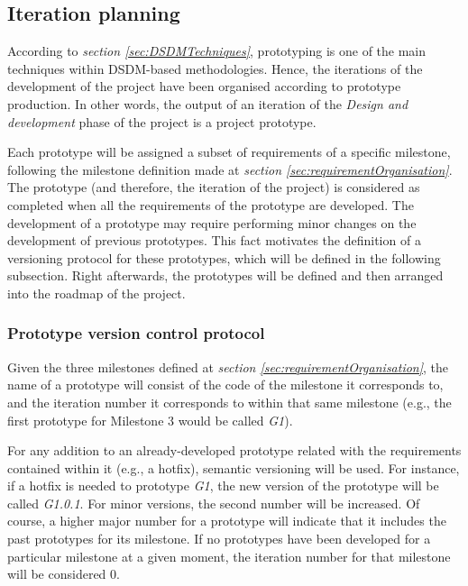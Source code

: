 \subsection{Iteration planning}

According to \emph{section \ref{sec:DSDMTechniques}}, prototyping is one of the main techniques within \acrshort{DSDM}-based methodologies. Hence, the iterations of the development
of the project have been organised according to prototype production. In other words, the output of an iteration of the \emph{Design and development} phase of the project is a project
prototype.

Each prototype will be assigned a subset of requirements of a specific milestone, following the milestone definition made at \emph{section \ref{sec:requirementOrganisation}}. The prototype
(and therefore, the iteration of the project) is considered as completed when all the requirements of the prototype are developed. The development of a prototype may require performing minor
changes on the development of previous prototypes. This fact motivates the definition of a versioning protocol for these prototypes, which will be defined in the following subsection. Right
afterwards, the prototypes will be defined and then arranged into the roadmap of the project.

\subsubsection{Prototype version control protocol}

Given the three milestones defined at \emph{section \ref{sec:requirementOrganisation}}, the name of a prototype will consist of the code of the milestone it corresponds to, 
and the iteration number it corresponds to within that same milestone (e.g., the first prototype for Milestone 3 would be called \emph{G1}).

For any addition to an already-developed prototype related with the requirements contained within it (e.g., a hotfix), semantic versioning will be used.
For instance, if a hotfix is needed to prototype \emph{G1}, the new version of the prototype will be called \emph{G1.0.1}. For minor versions, the second number will be increased. Of 
course, a higher major number for a prototype will indicate that it includes the past prototypes for its milestone\cite{semanticversioning}. If no prototypes have been developed
for a particular milestone at a given moment, the iteration number for that milestone will be considered 0.

